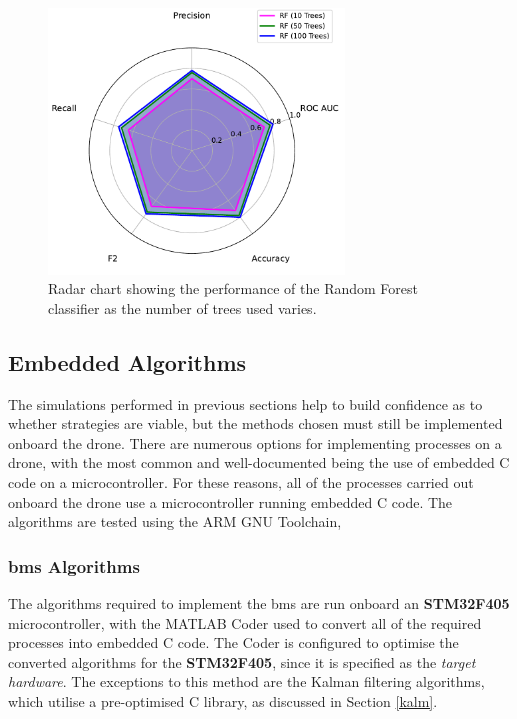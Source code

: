 \begin{figure}[H]
\centering
\includegraphics[width=0.7\textwidth]{figs/Samuel/Figures/rf_comparison (1) (cropped) (pdfresizer.com).pdf}
\caption{Radar chart showing the performance of the Random Forest classifier as the number of trees used varies.}
\label{fig:smote}
\end{figure}






\subsection{Embedded Algorithms}

The simulations performed in previous sections help to build confidence as to whether strategies are viable, but the methods chosen must still be implemented onboard the drone. There are numerous options for implementing processes on a drone, with the most common and well-documented being the use of embedded C code on a microcontroller. For these reasons, all of the processes carried out onboard the drone use a microcontroller running embedded C code. The algorithms are tested using the ARM GNU Toolchain, 

\subsubsection{\gls{bms} Algorithms}

The algorithms required to implement the \gls{bms} are run onboard an \textbf{STM32F405} microcontroller, with the MATLAB Coder used to convert all of the required processes into embedded C code. The Coder is configured to optimise the converted algorithms for the \textbf{STM32F405}, since it is specified as the \textit{target hardware}. The exceptions to this method are the Kalman filtering algorithms, which utilise a pre-optimised C library, as discussed in Section \ref{kalm}.

